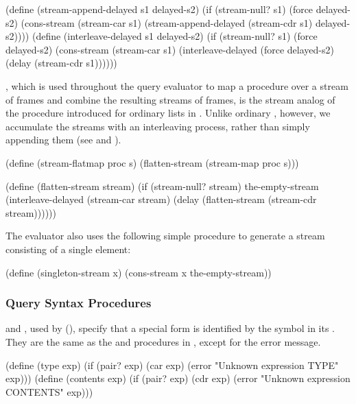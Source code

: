 \begin{codeBlock}
(define (stream-append-delayed s1 delayed-s2)
  (if (stream-null? s1)
      (force delayed-s2)
      (cons-stream
       (stream-car s1)
       (stream-append-delayed
        (stream-cdr s1)
        delayed-s2))))
(define (interleave-delayed s1 delayed-s2)
  (if (stream-null? s1)
      (force delayed-s2)
      (cons-stream
       (stream-car s1)
       (interleave-delayed
        (force delayed-s2)
        (delay (stream-cdr s1))))))
\end{codeBlock}

\noindent
{}, which is used throughout the query evaluator to map a
procedure over a stream of frames and combine the resulting streams of frames,
is the stream analog of the  procedure introduced for ordinary
lists in .  Unlike ordinary , however, we
accumulate the streams with an interleaving process, rather than simply
appending them (see  and ).

\begin{codeBlock}
(define (stream-flatmap proc s)
  (flatten-stream (stream-map proc s)))

(define (flatten-stream stream)
  (if (stream-null? stream)
      the-empty-stream
      (interleave-delayed
       (stream-car stream)
       (delay (flatten-stream (stream-cdr stream))))))
\end{codeBlock}

\noindent
The evaluator also uses the following simple procedure to generate a stream
consisting of a single element:

\begin{codeBlock}
(define (singleton-stream x)
  (cons-stream x the-empty-stream))
\end{codeBlock}

\subsubsection{Query Syntax Procedures}
\label{Section 4.4.4.7}

 and , used by  (),
specify that a special form is identified by the symbol in its .
They are the same as the  and  procedures in
, except for the error message.

\begin{codeBlock}
(define (type exp)
  (if (pair? exp)
      (car exp)
      (error "Unknown expression TYPE" exp)))
(define (contents exp)
  (if (pair? exp)
      (cdr exp)
      (error "Unknown expression CONTENTS" exp)))
\end{codeBlock}

